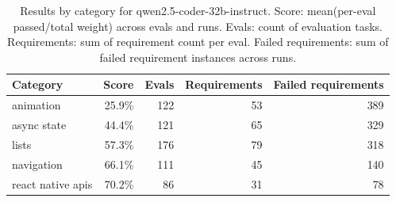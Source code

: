 \begin{table}[htbp]
\centering
\begin{tabular}{lrrrr}
\toprule
Category & Score & Evals & Requirements & Failed requirements \\
\midrule
animation & 25.9\% & 122 & 53 & 389 \\
async state & 44.4\% & 121 & 65 & 329 \\
lists & 57.3\% & 176 & 79 & 318 \\
navigation & 66.1\% & 111 & 45 & 140 \\
react native apis & 70.2\% & 86 & 31 & 78 \\
\bottomrule
\end{tabular}
\caption{Results by category for qwen2.5-coder-32b-instruct. Score: mean(per-eval passed/total weight) across evals and runs. Evals: count of evaluation tasks. Requirements: sum of requirement count per eval. Failed requirements: sum of failed requirement instances across runs.}
\end{table}
